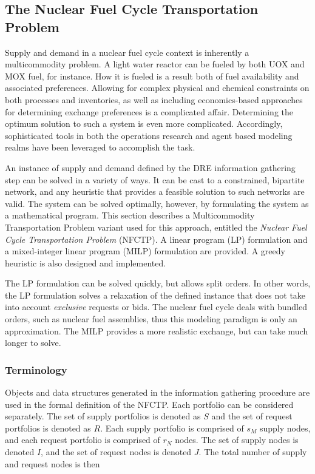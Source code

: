 \subsection{The Nuclear Fuel Cycle Transportation Problem}\label{abm:dre:fctp}

Supply and demand in a nuclear fuel cycle context is inherently a multicommodity
problem. A light water reactor can be fueled by both UOX and MOX fuel, for
instance. How it is fueled is a result both of fuel availability and associated
preferences. Allowing for complex physical and chemical constraints on both
processes and inventories, as well as including economics-based approaches for
determining exchange preferences is a complicated affair. Determining the
optimum solution to such a system is even more complicated. Accordingly,
sophisticated tools in both the operations research and agent based modeling
realms have been leveraged to accomplish the task.

An instance of supply and demand defined by the DRE information gathering step
can be solved in a variety of ways. It can be cast to a constrained, bipartite
network, and any heuristic that provides a feasible solution to such networks
are valid. The system can be solved optimally, however, by formulating the
system as a mathematical program. This section describes a Multicommodity
Transportation Problem variant used for this approach, entitled the
\textit{Nuclear Fuel Cycle Transportation Problem} (NFCTP). A linear program
(LP) formulation and a mixed-integer linear program (MILP) formulation are
provided. A greedy heuristic is also designed and implemented.

The LP formulation can be solved quickly, but allows split orders. In other
words, the LP formulation solves a relaxation of the defined instance that does
not take into account \textit{exclusive} requests or bids. The nuclear fuel
cycle deals with bundled orders, such as nuclear fuel assemblies, thus this
modeling paradigm is only an approximation. The MILP provides a more realistic
exchange, but can take much longer to solve. 

\subsubsection{Terminology}

Objects and data structures generated in the information gathering procedure are
used in the formal definition of the NFCTP. Each portfolio can be considered
separately. The set of supply portfolios is denoted as $S$ and the set of
request portfolios is denoted as $R$. Each supply portfolio is comprised of
$s_M$ supply nodes, and each request portfolio is comprised of $r_N$ nodes. The
set of supply nodes is denoted $I$, and the set of request nodes is denoted
$J$. The total number of supply and request nodes is then

